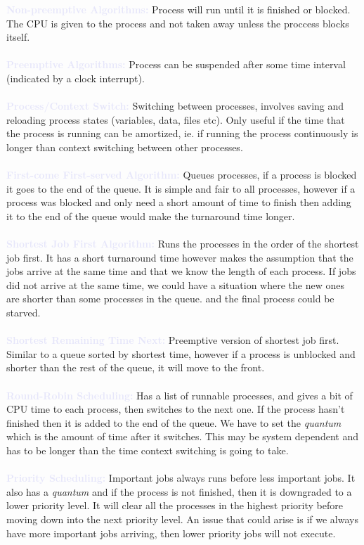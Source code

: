 \documentclass[a4paper,10pt]{article}
\begin{document}
\newpage
\noindent \textcolor{Lavender}{\textbf{Non-preemptive Algorithms:}} Process will run until it is finished or blocked. The CPU is given to the process and not taken away unless the proccess blocks itself. \\\\
\textcolor{Lavender}{\textbf{Preemptive Algorithms:}} Process can be suspended after some time interval (indicated by a clock interrupt). \\\\
\textcolor{Lavender}{\textbf{Process/Context Switch:}} Switching between processes, involves saving and reloading process states (variables, data, files etc). Only useful if the time that the process is running can be amortized, ie. if running the process continuously is longer than context switching between other processes. \\\\
\textcolor{Lavender}{\textbf{First-come First-served Algorithm:}} Queues processes, if a process is blocked it goes to the end of the queue. It is simple and fair to all processes, however if a process was blocked and only need a short amount of time to finish then adding it to the end of the queue would make the turnaround time longer. \\\\
\textcolor{Lavender}{\textbf{Shortest Job First Algorithm:}} Runs the processes in the order of the shortest job first. It has a short turnaround time however makes the assumption that the jobs arrive at the same time and that we know the length of each process. If jobs did not arrive at the same time, we could have a situation where the new ones are shorter than some processes in the queue. and the final process could be starved. \\\\
\textcolor{Lavender}{\textbf{Shortest Remaining Time Next:}} Preemptive version of shortest job first. Similar to a queue sorted by shortest time, however if a process is unblocked and shorter than the rest of the queue, it will move to the front. \\\\
\textcolor{Lavender}{\textbf{Round-Robin Scheduling:}} Has a list of runnable processes, and gives a bit of CPU time to each process, then switches to the next one. If the process hasn't finished then it is added to the end of the queue. We have to set the \textit{quantum} which is the amount of time after it switches. This may be system dependent and has to be longer than the time context switching is going to take. \\\\ 
\textcolor{Lavender}{\textbf{Priority Scheduling:}} Important jobs always runs before less important jobs. It also has a \textit{quantum} and if the process is not finished, then it is downgraded to a lower priority level. It will clear all the processes in the highest priority before moving down into the next priority level. An issue that could arise is if we always have more important jobs arriving, then lower priority jobs will not execute.
\end{document}

